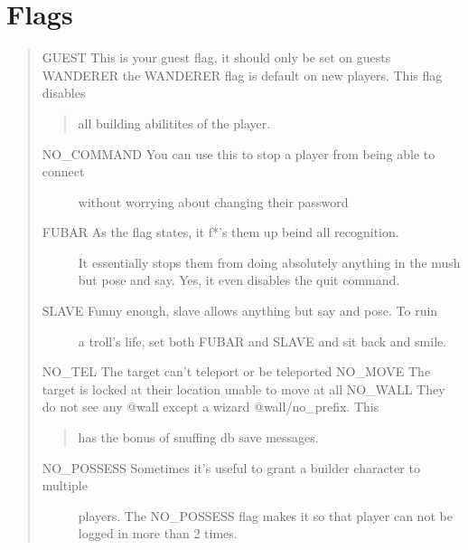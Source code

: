 \documentclass[letterpaper,10pt,english]{sphinxmanual}
\begin{document}
\section{Flags}
\label{\detokenize{08-lockdown:flags}}\begin{quote}

\sphinxAtStartPar
GUEST    \sphinxhyphen{} This is your guest flag, it should only be set on guests
WANDERER \sphinxhyphen{} the WANDERER flag is default on new players.  This flag disables
\begin{quote}

\sphinxAtStartPar
all building abilitites of the player.
\end{quote}
\begin{description}
\item[{NO\_COMMAND \sphinxhyphen{} You can use this to stop a player from being able to connect}] \leavevmode
\sphinxAtStartPar
without worrying about changing their password

\item[{FUBAR      \sphinxhyphen{} As the flag states, it f*’s them up beind all recognition.}] \leavevmode
\sphinxAtStartPar
It essentially stops them from doing absolutely anything in the
mush but pose and say.  Yes, it even disables the quit command.

\item[{SLAVE      \sphinxhyphen{} Funny enough, slave allows anything but say and pose.  To ruin}] \leavevmode
\sphinxAtStartPar
a troll’s life, set both FUBAR and SLAVE and sit back and smile.

\end{description}

\sphinxAtStartPar
NO\_TEL     \sphinxhyphen{} The target can’t teleport or be teleported
NO\_MOVE    \sphinxhyphen{} The target is locked at their location unable to move at all
NO\_WALL    \sphinxhyphen{} They do not see any @wall except a wizard @wall/no\_prefix.  This
\begin{quote}

\sphinxAtStartPar
has the bonus of snuffing db save messages.
\end{quote}
\begin{description}
\item[{NO\_POSSESS \sphinxhyphen{} Sometimes it’s useful to grant a builder character to multiple}] \leavevmode
\sphinxAtStartPar
players.  The NO\_POSSESS flag makes it so that player can not
be logged in more than 2 times.

\end{description}


\end{quote}
\end{document}
